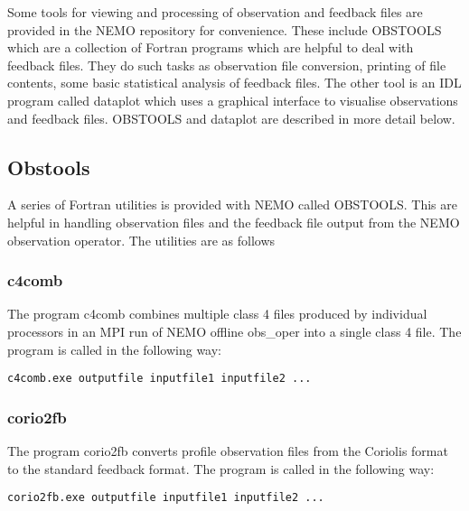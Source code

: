 \documentclass[NEMO_book]{subfiles}
\begin{document}
Some tools for viewing and processing of observation and feedback files are provided in the
NEMO repository for convenience. These include OBSTOOLS which are a collection of Fortran
programs which are helpful to deal with feedback files. They do such tasks as observation file
conversion, printing of file contents, some basic statistical analysis of feedback files. The
other tool is an IDL program called dataplot which uses a graphical interface to visualise
observations and feedback files. OBSTOOLS and dataplot are described in more detail below.  

\subsection{Obstools}

A series of Fortran utilities is provided with NEMO called OBSTOOLS. This are helpful in
handling observation files and the feedback file output from the NEMO observation operator.
The utilities are as follows

\subsubsection{c4comb}

The program c4comb combines multiple class 4 files produced by individual processors in an
MPI run of NEMO offline obs\_oper into a single class 4 file. The program is called in the following way:

\begin{alltt}
\footnotesize
\begin{verbatim}
c4comb.exe outputfile inputfile1 inputfile2 ...
\end{verbatim}
\end{alltt}

\subsubsection{corio2fb}

The program corio2fb converts profile observation files from the Coriolis format to the
standard feedback format. The program is called in the following way:

\begin{alltt}
\footnotesize
\begin{verbatim}
corio2fb.exe outputfile inputfile1 inputfile2 ...
\end{verbatim}
\end{alltt}
\end{document}
